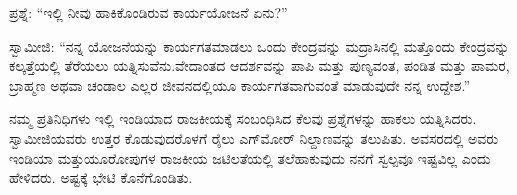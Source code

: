 \vskip 0.1cm

ಪ್ರಶ್ನೆ: “ಇಲ್ಲಿ ನೀವು ಹಾಕಿಕೊಂಡಿರುವ ಕಾರ್ಯಯೋಜನೆ ಏನು?”

\vskip 0.1cm

ಸ್ವಾಮೀಜಿ: “ನನ್ನ ಯೋಜನೆಯನ್ನು ಕಾರ್ಯಗತಮಾಡಲು ಒಂದು ಕೇಂದ್ರವನ್ನು ಮದ್ರಾಸಿನಲ್ಲಿ ಮತ್ತೊಂದು ಕೇಂದ್ರವನ್ನು ಕಲ್ಕತ್ತೆಯಲ್ಲಿ ತೆರೆಯಲು ಯತ್ನಿಸುವೆನು.\break ವೇದಾಂತದ ಆದರ್ಶವನ್ನು ಪಾಪಿ ಮತ್ತು ಪುಣ್ಯವಂತ, ಪಂಡಿತ ಮತ್ತು ಪಾಮರ, ಬ್ರಾಹ್ಮಣ ಅಥವಾ ಚಂಡಾಲ ಎಲ್ಲರ ಜೀವನದಲ್ಲಿಯೂ ಕಾರ್ಯಗತವಾಗುವಂತೆ ಮಾಡುವುದೇ ನನ್ನ ಉದ್ದೇಶ.”

ನಮ್ಮ ಪ್ರತಿನಿಧಿಗಳು ಇಲ್ಲಿ ಇಂಡಿಯಾದ ರಾಜಕೀಯಕ್ಕೆ ಸಂಬಂಧಿಸಿದ ಕೆಲವು ಪ್ರಶ್ನೆಗಳನ್ನು ಹಾಕಲು ಯತ್ನಿಸಿದರು. ಸ್ವಾಮೀಜಿಯವರು ಉತ್ತರ ಕೊಡುವುದರೊಳಗೆ ರೈಲು ಎಗ್​ಮೋರ್​ ನಿಲ್ದಾಣವನ್ನು ತಲುಪಿತು. ಅವಸರದಲ್ಲಿ ಅವರು ಇಂಡಿಯಾ ಮತ್ತು\break ಯೂರೋಪುಗಳ ರಾಜಕೀಯ ಜಟಿಲತೆಯಲ್ಲಿ ತಲೆಹಾಕುವುದು ನನಗೆ ಸ್ವಲ್ಪವೂ ಇಷ್ಟವಿಲ್ಲ ಎಂದು ಹೇಳಿದರು. ಅಷ್ಟಕ್ಕೆ ಭೇಟಿ ಕೊನೆಗೊಂಡಿತು.


